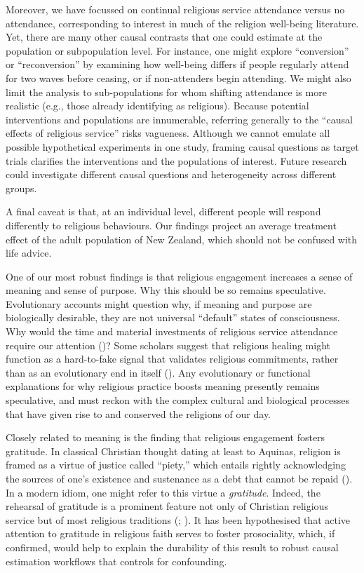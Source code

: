\documentclass[
  single column]{article}
\begin{document}
Moreover, we have focussed on continual religious service attendance
versus no attendance, corresponding to interest in much of the religion
well-being literature. Yet, there are many other causal contrasts that
one could estimate at the population or subpopulation level. For
instance, one might explore ``conversion'' or ``reconversion'' by
examining how well-being differs if people regularly attend for two
waves before ceasing, or if non-attenders begin attending. We might also
limit the analysis to sub-populations for whom shifting attendance is
more realistic (e.g., those already identifying as religious). Because
potential interventions and populations are innumerable, referring
generally to the ``causal effects of religious service'' risks
vagueness. Although we cannot emulate all possible hypothetical
experiments in one study, framing causal questions as target trials
clarifies the interventions and the populations of interest. Future
research could investigate different causal questions and heterogeneity
across different groups.

A final caveat is that, at an individual level, different people will
respond differently to religious behaviours. Our findings project an
average treatment effect of the adult population of New Zealand, which
should not be confused with life advice.

One of our most robust findings is that religious engagement increases a
sense of meaning and sense of purpose. Why this should be so remains
speculative. Evolutionary accounts might question why, if meaning and
purpose are biologically desirable, they are not universal ``default''
states of consciousness. Why would the time and material investments of
religious service attendance require our attention
()? Some
scholars suggest that religious healing might function as a hard-to-fake
signal that validates religious commitments, rather than as an
evolutionary end in itself (). Any evolutionary or functional explanations for why religious
practice boosts meaning presently remains speculative, and must reckon
with the complex cultural and biological processes that have given rise
to and conserved the religions of our day.

Closely related to meaning is the finding that religious engagement
fosters gratitude. In classical Christian thought dating at least to
Aquinas, religion is framed as a virtue of justice called ``piety,''
which entails rightly acknowledging the sources of one's existence and
sustenance as a debt that cannot be repaid
(). In a modern
idiom, one might refer to this virtue a \emph{gratitude}. Indeed, the
rehearsal of gratitude is a prominent feature not only of Christian
religious service but of most religious traditions
(;
).
It has been hypothesised that active attention to gratitude in religious
faith serves to foster prosociality, which, if confirmed, would help to
explain the durability of this result to robust causal estimation
workflows that controls for confounding.
\end{document}
